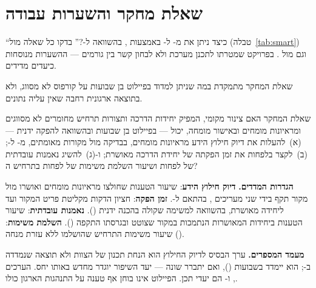 \section{שאלת מחקר והשערות עבודה}\label{sec:rq}
\begin{pcguide}
“כיצד ניתן  את  מ- ל- באמצעות , בהשוואה ל-?”
בדקו כל שאלה מול  (טבלה~\ref{tab:smart}) וגם מול .
בפרויקט שמטרתו לתכנן מערכת ולא לבחון קשר בין גורמים --- ההשערות מנוסחות כיעדים מדידים.
\end{pcguide}
שאלת המחקר מתמקדת במה שניתן למדוד בפיילוט בן  שבועות על קורפוס לא מסווג, ולא בתוצאה ארגונית רחבה
שאין עליה נתונים.
\begin{pcbox}[pcPrimary]{שאלת המחקר}
האם צינור  מקומי, המפיק יחידות הדרכה ותצורות תרחיש  מחומרים לא מסווגים ומראיונות מומחים ובאישור
מומחה, יכול --- בפיילוט בן  שבועות ובהשוואה להפקה ידנית --- (א)~להעלות את דיוק חילוץ הידע מראיונות
מומחים, בבדיקה מול מקורות מאומתים, מ- ל-; (ב)~לקצר בלפחות  את זמן הפקתה של יחידת הדרכה
מאושרת; ו-(ג)~להשיג נאמנות עובדתית של לפחות  ושיעור השלמת משימות של לפחות  בתרחיש ה\threeDadj{}?
\end{pcbox}
\textbf{הגדרות המדדים.} \textbf{דיוק חילוץ הידע}: שיעור הטענות שחולצו מראיונות מומחים ואושרו מול מקור תקף בידי שני מעריכים
, בהתאם ל-. \textbf{זמן הפקה}: חציון הדקות מקליטת פריט המקור ועד ליחידה מאושרת,
בהשוואה למשימה שקולה בהכנה ידנית (). \textbf{נאמנות עובדתית}: שיעור הטענות ביחידות המאושרות הנתמכות במקור
שצוטט ובגרסתו התקפה (). \textbf{השלמת משימות}: שיעור משימות התרחיש שהושלמו ללא עזרת מנחה ().

\textbf{מעמד המספרים.} ערך הבסיס  לדיוק החילוץ הוא הנחת תכנון של הצוות ולא תוצאה שנמדדה ב-;
הוא יימדד בשבועות  (), ואם יתברר שונה --- יעד השיפור יוגדר מחדש באותו יחס. הערכים ,
 ו- הם יעדי תכן. הפיילוט אינו בוחן אף טענה על התנהגות הארגון כולו.

